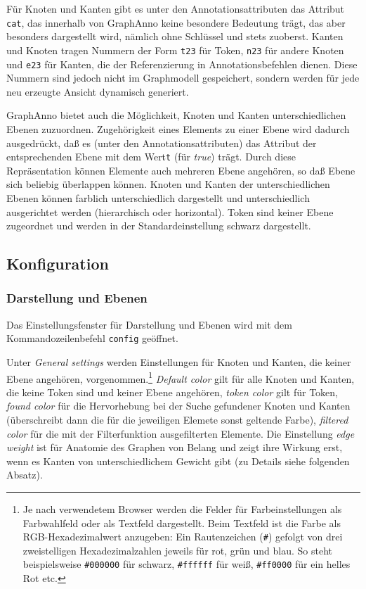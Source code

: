 \documentclass[12pt]{scrartcl}
\begin{document}
Für Knoten und Kanten gibt es unter den Annotationsattributen das Attribut \texttt{cat}, das innerhalb von GraphAnno keine besondere Bedeutung trägt, das aber besonders dargestellt wird, nämlich ohne Schlüssel und stets zuoberst.
Kanten und Knoten tragen Nummern der Form \texttt{t23} für Token, \texttt{n23} für andere Knoten und \texttt{e23} für Kanten, die der Referenzierung in Annotationsbefehlen dienen.
Diese Nummern sind jedoch nicht im Graphmodell gespeichert, sondern werden für jede neu erzeugte Ansicht dynamisch generiert.

GraphAnno bietet auch die Möglichkeit, Knoten und Kanten unterschiedlichen Ebenen zuzuordnen. Zugehörigkeit eines Elements zu einer Ebene wird dadurch ausgedrückt, daß es (unter den Annotationsattributen) das Attribut der entsprechenden Ebene mit dem Wert\texttt{t} (für \textit{true}) trägt. Durch diese Repräsentation können Elemente auch mehreren Ebene angehören, so daß Ebene sich beliebig überlappen können. Knoten und Kanten der unterschiedlichen Ebenen können farblich unterschiedlich dargestellt und unterschiedlich ausgerichtet werden (hierarchisch oder horizontal). Token sind keiner Ebene zugeordnet und werden in der Standardeinstellung schwarz dargestellt.



\subsection{Konfiguration}\label{konfiguration}

\subsubsection{Darstellung und Ebenen}\label{ebenenkonfiguration}

Das Einstellungsfenster für Darstellung und Ebenen wird mit dem Kommandozeilenbefehl \texttt{config} geöffnet.

Unter \textit{General settings} werden Einstellungen für Knoten und Kanten, die keiner Ebene angehören, vorgenommen.\footnote{Je nach verwendetem Browser werden die Felder für Farbeinstellungen als Farbwahlfeld oder als Textfeld dargestellt. Beim Textfeld ist die Farbe als RGB-Hexadezimalwert anzugeben: Ein Rautenzeichen (\texttt{\#}) gefolgt von drei zweistelligen Hexadezimalzahlen jeweils für rot, grün und blau. So steht beispielsweise \texttt{\#000000} für schwarz, \texttt{\#ffffff} für weiß, \texttt{\#ff0000} für ein helles Rot etc.} \textit{Default color} gilt für alle Knoten und Kanten, die keine Token sind und keiner Ebene angehören, \textit{token color} gilt für Token, \textit{found color} für die Hervorhebung bei der Suche gefundener Knoten und Kanten (überschreibt dann die für die jeweiligen Elemete sonst geltende Farbe), \textit{filtered color} für die mit der Filterfunktion ausgefilterten Elemente. Die Einstellung \textit{edge weight} ist für Anatomie des Graphen von Belang und zeigt ihre Wirkung erst, wenn es Kanten von unterschiedlichem Gewicht gibt (zu Details siehe folgenden Absatz).
\end{document}
